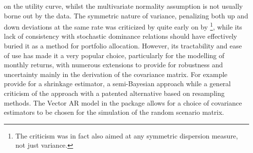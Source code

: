 on the utility curve, whilst the multivariate normality assumption is not
usually borne out by the data. The symmetric nature of variance, penalizing
both up and down deviations at the same rate was criticized by quite early on
by \citet{Hanoch1969}\footnote{The criticism was in fact also aimed at
any symmetric dispersion measure, not just variance.}, while its lack of
consistency with stochastic dominance relations should have effectively
buried it as a method for portfolio allocation. However, its tractability and
ease of use has made it a very popular choice, particularly for the modelling
of monthly returns, with numerous extensions to provide for robustness and
uncertainty mainly in the derivation of the covariance matrix. For example
\citet{James1956} provide for a shrinkage estimator, \citet{Black1992} a
semi-Bayesian approach while \citet{Michaud1989} a general criticism of the
approach with a patented alternative based on resampling methods. The Vector AR
model in the package allows for a choice of covariance estimators to be chosen
for the simulation of the random scenario matrix.
